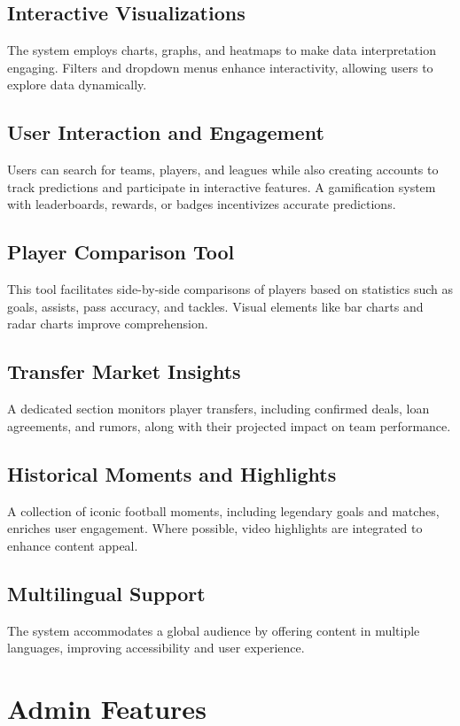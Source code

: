 \subsection{Interactive Visualizations}
The system employs charts, graphs, and heatmaps to make data interpretation engaging. Filters and dropdown menus enhance interactivity, allowing users to explore data dynamically.

\subsection{User Interaction and Engagement}
Users can search for teams, players, and leagues while also creating accounts to track predictions and participate in interactive features. A gamification system with leaderboards, rewards, or badges incentivizes accurate predictions.

\subsection{Player Comparison Tool}
This tool facilitates side-by-side comparisons of players based on statistics such as goals, assists, pass accuracy, and tackles. Visual elements like bar charts and radar charts improve comprehension.

\subsection{Transfer Market Insights}
A dedicated section monitors player transfers, including confirmed deals, loan agreements, and rumors, along with their projected impact on team performance.

\subsection{Historical Moments and Highlights}
A collection of iconic football moments, including legendary goals and matches, enriches user engagement. Where possible, video highlights are integrated to enhance content appeal.

\subsection{Multilingual Support}
The system accommodates a global audience by offering content in multiple languages, improving accessibility and user experience.

\section{Admin Features}

